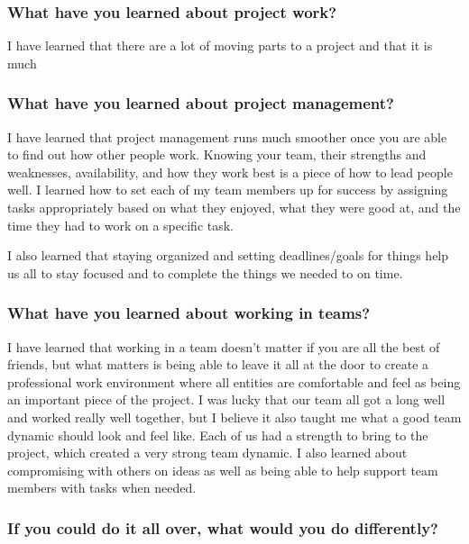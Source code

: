 \subsubsection{What have you learned about project work?}%
I have learned that there are a lot of moving parts to a project and that it is much

\subsubsection{What have you learned about project management?}
I have learned that project management runs much smoother once you are able to find out how other people work. Knowing your team, their strengths and weaknesses, availability, and how they work best is a piece of how to lead people well. I learned how to set each of my team members up for success by assigning tasks appropriately based on what they enjoyed, what they were good at, and the time they had to work on a specific task. 
\par
I also learned that staying organized and setting deadlines/goals for things help us all to stay focused and to complete the things we needed to on time.\\

\subsubsection{What have you learned about working in teams?}
I have learned that working in a team doesn't matter if you are all the best of friends, but what matters is being able to leave it all at the door to create a professional work environment where all entities are comfortable and feel as being an important piece of the project. I was lucky that our team all got a long well and worked really well together, but I believe it also taught me what a good team dynamic should look and feel like. Each of us had a strength to bring to the project, which created a very strong team dynamic. I also learned about compromising with others on ideas as well as being able to help support team members with tasks when needed.\\ 

\subsubsection{If you could do it all over, what would you do differently?}
